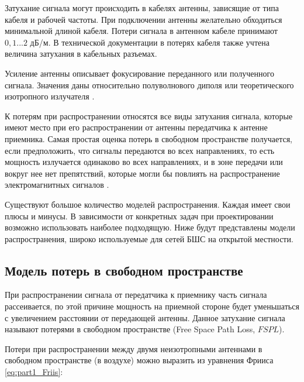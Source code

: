 Затухание сигнала могут происходить в кабелях антенны, зависящие от типа кабеля и рабочей частоты. При подключении антенны желательно обходиться минимальной длиной кабеля. Потери сигнала в антенном кабеле принимают $0, 1...2$ дБ/м. В технической документации в потерях кабеля также учтена величина затухания в кабельных разъемах. 

Усиление антенны описывает фокусирование переданного или полученного сигнала. Значения даны относительно полуволнового диполя или теоретического изотропного излучателя \cite{Gost62657}.


К потерям при распространении относятся все виды затухания сигнала, которые имеют место при его распространении от антенны передатчика к антенне приемника. Самая простая оценка потерь в свободном пространстве получается, если предположить, что сигналы передаются во всех направлениях, то есть мощность излучается одинаково во всех направлениях, и в зоне передачи или вокруг нее нет препятствий, которые могли бы повлиять на распространение электромагнитных сигналов \cite{Krouk2010}. 


Существуют большое количество моделей распространения. Каждая имеет свои плюсы и минусы. В зависимости от конкретных задач при проектировании возможно использовать наиболее подходящую. Ниже будут представлены модели распространения, широко используемые для сетей БШС на открытой местности.  

\subsection{Модель потерь в свободном пространстве}
При распространении сигнала от передатчика к приемнику часть сигнала рассеивается, по этой причине мощность на приемной стороне будет уменьшаться с увеличением  расстоянии от передающей антенны. Данное затухание сигнала называют потерями в свободном пространстве (Free Space Path Loss, $FSPL$).

Потери при распространении между двумя неизотропными антеннами в свободном пространстве (в воздухе) можно выразить из уравнения Фрииса \cref{eq:part1_Friis}:


